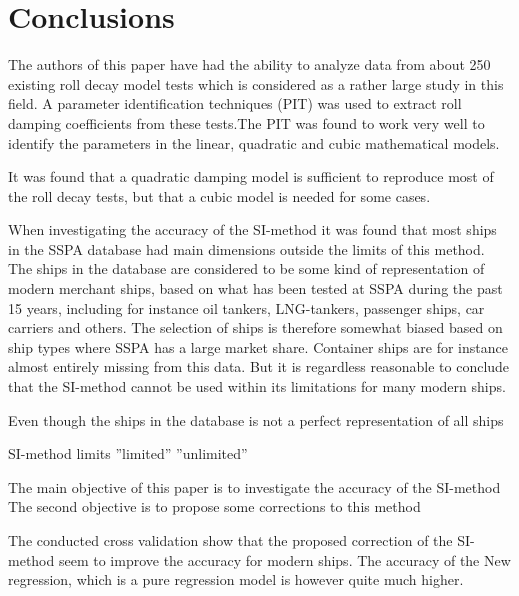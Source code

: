 \section{Conclusions}
\label{se:conclusions}
The authors of this paper have had the ability to analyze data from about 250 existing roll decay model tests which is considered as a rather large study in this field. A parameter identification techniques (PIT) was used to extract roll damping coefficients from these tests.The PIT was found to work very well to identify the parameters in the linear, quadratic and cubic mathematical models. 

It was found that a quadratic damping model is sufficient to reproduce most of the roll decay tests, but that a cubic model is needed for some cases. 

When investigating the accuracy of the SI-method it was found that most ships in the SSPA database had main dimensions outside the limits of this method. The ships in the database are considered to be some kind of representation of modern merchant ships, based on what has been tested at SSPA during the past 15 years, including for instance oil tankers, LNG-tankers, passenger ships, car carriers and others. The selection of ships is therefore somewhat biased based on ship types where SSPA has a large market share. Container ships are for instance almost entirely missing from this data. But it is regardless reasonable to conclude that the SI-method cannot be used within its limitations for many modern ships.  

Even though the ships in the database is not a perfect representation of all ships  


SI-method limits
''limited'' ''unlimited''


The main objective of this paper is to investigate the accuracy of the SI-method
The second objective is to propose some corrections to this method

The conducted cross validation show that the proposed correction of the SI-method seem to improve the accuracy for modern ships. The accuracy of the New regression, which is a pure regression model is however quite much higher. 





